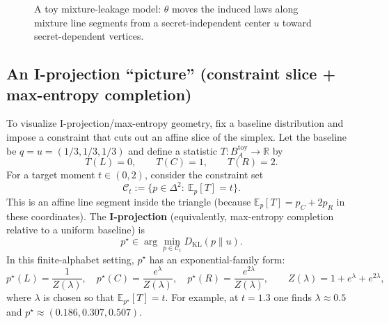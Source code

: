 \documentclass[11pt,a4paper]{article}
\theoremstyle{definition}
\theoremstyle{plain}
\newcommand{\R}{\mathbb{R}}
\begin{document}
\begin{figure}[ht]
\centering
{}
\caption{A toy mixture-leakage model: $\theta$ moves the induced laws along mixture line segments from a secret-independent center $u$ toward secret-dependent vertices.}
\label{fig:toy-mixture-lines}
\end{figure}

\subsection{An I-projection ``picture'' (constraint slice + max-entropy completion)}
\label{subsec:toy-i-projection-picture}

To visualize I-projection/max-entropy geometry, fix a baseline distribution and impose a constraint that cuts out an affine slice of the simplex.
Let the baseline be $q=u=(1/3,1/3,1/3)$ and define a statistic $T:B_A^{\mathrm{toy}}\to\R$ by
\[
T(L)=0,\qquad T(C)=1,\qquad T(R)=2.
\]
For a target moment $t\in(0,2)$, consider the constraint set
\[
\mathcal{C}_t:=\{p\in\Delta^2:\ \mathbb{E}_p[T]=t\}.
\]
This is an affine line segment inside the triangle (because $\mathbb{E}_p[T]=p_C+2p_R$ in these coordinates).
The \textbf{I-projection} (equivalently, max-entropy completion relative to a uniform baseline) is
\[
p^\star\in \arg\min_{p\in \mathcal{C}_t} D_{\mathrm{KL}}(p\|u).
\]
In this finite-alphabet setting, $p^\star$ has an exponential-family form:
\[
p^\star(L)=\frac{1}{Z(\lambda)},\quad
p^\star(C)=\frac{e^\lambda}{Z(\lambda)},\quad
p^\star(R)=\frac{e^{2\lambda}}{Z(\lambda)},\qquad
Z(\lambda)=1+e^\lambda+e^{2\lambda},
\]
where $\lambda$ is chosen so that $\mathbb{E}_{p^\star}[T]=t$.
For example, at $t=1.3$ one finds $\lambda\approx 0.5$ and $p^\star\approx (0.186,0.307,0.507)$.
\end{document}
